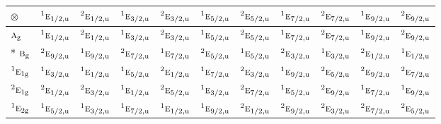 \documentclass[10pt,a4paper]{article}
\numberwithin{equation}{section}
\newcommand{\irr}[1]{\text{\normalfont\scshape #1}}
\newcommand{\conjpair}[1]{{}^{#1}}
\newcommand{\ptag}[1]{\mathrm{#1}}
\newcommand{\irrprod}{\otimes}
\begin{document}
{\small\setlength{\tabcolsep}{3pt}\begin{longtable}{@{}lcccccccccc@{}}\toprule
$\irrprod$ & $\conjpair{1}\irr{e}_{1/2,\ptag{u}}$ & $\conjpair{2}\irr{e}_{1/2,\ptag{u}}$ & $\conjpair{1}\irr{e}_{3/2,\ptag{u}}$ & $\conjpair{2}\irr{e}_{3/2,\ptag{u}}$ & $\conjpair{1}\irr{e}_{5/2,\ptag{u}}$ & $\conjpair{2}\irr{e}_{5/2,\ptag{u}}$ & $\conjpair{1}\irr{e}_{7/2,\ptag{u}}$ & $\conjpair{2}\irr{e}_{7/2,\ptag{u}}$ & $\conjpair{1}\irr{e}_{9/2,\ptag{u}}$ & $\conjpair{2}\irr{e}_{9/2,\ptag{u}}$\\\midrule\endhead
\bottomrule\endfoot\endlastfoot
$\irr{a}_{\ptag{g}}$ & $\conjpair{1}\irr{e}_{1/2,\ptag{u}}$ & $\conjpair{2}\irr{e}_{1/2,\ptag{u}}$ & $\conjpair{1}\irr{e}_{3/2,\ptag{u}}$ & $\conjpair{2}\irr{e}_{3/2,\ptag{u}}$ & $\conjpair{1}\irr{e}_{5/2,\ptag{u}}$ & $\conjpair{2}\irr{e}_{5/2,\ptag{u}}$ & $\conjpair{1}\irr{e}_{7/2,\ptag{u}}$ & $\conjpair{2}\irr{e}_{7/2,\ptag{u}}$ & $\conjpair{1}\irr{e}_{9/2,\ptag{u}}$ & $\conjpair{2}\irr{e}_{9/2,\ptag{u}}$\\*
$\irr{b}_{\ptag{g}}$ & $\conjpair{2}\irr{e}_{9/2,\ptag{u}}$ & $\conjpair{1}\irr{e}_{9/2,\ptag{u}}$ & $\conjpair{2}\irr{e}_{7/2,\ptag{u}}$ & $\conjpair{1}\irr{e}_{7/2,\ptag{u}}$ & $\conjpair{2}\irr{e}_{5/2,\ptag{u}}$ & $\conjpair{1}\irr{e}_{5/2,\ptag{u}}$ & $\conjpair{2}\irr{e}_{3/2,\ptag{u}}$ & $\conjpair{1}\irr{e}_{3/2,\ptag{u}}$ & $\conjpair{2}\irr{e}_{1/2,\ptag{u}}$ & $\conjpair{1}\irr{e}_{1/2,\ptag{u}}$\\
$\conjpair{1}\irr{e}_{1\ptag{g}}$ & $\conjpair{1}\irr{e}_{3/2,\ptag{u}}$ & $\conjpair{1}\irr{e}_{1/2,\ptag{u}}$ & $\conjpair{1}\irr{e}_{5/2,\ptag{u}}$ & $\conjpair{2}\irr{e}_{1/2,\ptag{u}}$ & $\conjpair{1}\irr{e}_{7/2,\ptag{u}}$ & $\conjpair{2}\irr{e}_{3/2,\ptag{u}}$ & $\conjpair{1}\irr{e}_{9/2,\ptag{u}}$ & $\conjpair{2}\irr{e}_{5/2,\ptag{u}}$ & $\conjpair{2}\irr{e}_{9/2,\ptag{u}}$ & $\conjpair{2}\irr{e}_{7/2,\ptag{u}}$\\
$\conjpair{2}\irr{e}_{1\ptag{g}}$ & $\conjpair{2}\irr{e}_{1/2,\ptag{u}}$ & $\conjpair{2}\irr{e}_{3/2,\ptag{u}}$ & $\conjpair{1}\irr{e}_{1/2,\ptag{u}}$ & $\conjpair{2}\irr{e}_{5/2,\ptag{u}}$ & $\conjpair{1}\irr{e}_{3/2,\ptag{u}}$ & $\conjpair{2}\irr{e}_{7/2,\ptag{u}}$ & $\conjpair{1}\irr{e}_{5/2,\ptag{u}}$ & $\conjpair{2}\irr{e}_{9/2,\ptag{u}}$ & $\conjpair{1}\irr{e}_{7/2,\ptag{u}}$ & $\conjpair{1}\irr{e}_{9/2,\ptag{u}}$\\
$\conjpair{1}\irr{e}_{2\ptag{g}}$ & $\conjpair{1}\irr{e}_{5/2,\ptag{u}}$ & $\conjpair{1}\irr{e}_{3/2,\ptag{u}}$ & $\conjpair{1}\irr{e}_{7/2,\ptag{u}}$ & $\conjpair{1}\irr{e}_{1/2,\ptag{u}}$ & $\conjpair{1}\irr{e}_{9/2,\ptag{u}}$ & $\conjpair{2}\irr{e}_{1/2,\ptag{u}}$ & $\conjpair{2}\irr{e}_{9/2,\ptag{u}}$ & $\conjpair{2}\irr{e}_{3/2,\ptag{u}}$ & $\conjpair{2}\irr{e}_{7/2,\ptag{u}}$ & $\conjpair{2}\irr{e}_{5/2,\ptag{u}}$\\

\end{longtable}}
\end{document}
